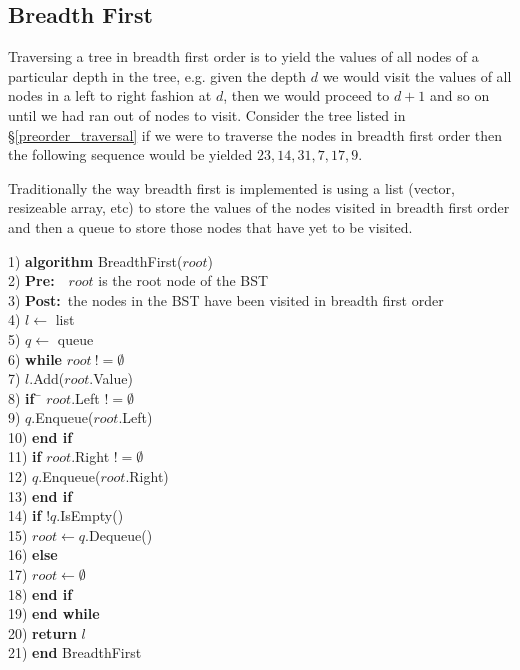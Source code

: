 \subsection{Breadth First} \label{breadth_first}
Traversing a tree in breadth first order is to yield the values of all nodes of a particular depth in the tree, e.g. given the depth $d$ we would visit the values of all nodes in a left to right fashion at $d$, then we would proceed to $d+1$ and so on until we had ran out of nodes to visit. Consider the tree listed in \S\ref{preorder_traversal} if we were to traverse the nodes in breadth first order then the following sequence would be yielded $23, 14, 31, 7, 17, 9$. 

Traditionally the way breadth first is implemented is using a list (vector, resizeable array, etc) to store the values of the nodes visited in breadth first order and then a queue to store those nodes that have yet to be visited.

\begin{tabbing}
1)  \textbf{alg}\= \textbf{orithm} BreadthFirst($root$) \\
2)  \> \textbf{Pre:}~~$root$ is the root node of the BST \\
3)  \> \textbf{Post:}~the nodes in the BST have been visited in breadth first order \\
4)  \> $l \leftarrow$ list \\
5)  \> $q \leftarrow$ queue \\
6)  \> \textbf{whi}\= \textbf{le} $root~!= \emptyset$ \\
7)  \> \> $l$.Add($root$.Value) \\
8)  \> \> \textbf{if}~\= $root$.Left $!= \emptyset$ \\
9)  \> \> \> $q$.Enqueue($root$.Left) \\
10) \> \> \textbf{end if} \\
11) \> \> \textbf{if} $root$.Right $!= \emptyset$ \\
12) \> \> \> $q$.Enqueue($root$.Right) \\
13) \> \> \textbf{end if} \\
14) \> \> \textbf{if} $!q$.IsEmpty() \\
15) \> \> \> $root \leftarrow q$.Dequeue() \\
16) \> \> \textbf{else} \\
17) \> \> \> $root \leftarrow \emptyset$ \\
18) \> \> \textbf{end if} \\
19) \> \textbf{end while} \\
20) \> \textbf{return} $l$ \\
21) \textbf{end} BreadthFirst \\
\end{tabbing}
